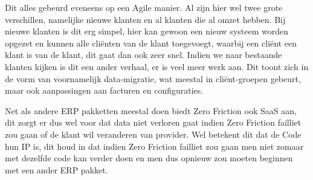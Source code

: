 Dit alles gebeurd eveneens op een Agile manier. Al zijn hier wel twee grote verschillen, namelijke nieuwe klanten en al klanten die al omzet hebben. Bij nieuwe klanten is dit erg simpel, hier kan gewoon een nieuw systeem worden opgezet en kunnen alle cliënten van de klant toegevoegt, waarbij een cliënt een klant is van de klant, dit gaat dan ook zeer snel. Indien we naar bestaande klanten kijken is dit een ander verhaal, er is veel meer werk aan. Dit toont zich in de vorm van voornamelijk data-migratie, wat meestal in cliënt-groepen gebeurt, maar ook aanpassingen aan facturen en configuraties.

Net als andere ERP pakketten meestal doen biedt Zero Friction ook SaaS aan, dit zorgt er dus wel voor dat data niet verloren gaat indien Zero Friction failliet zou gaan of de klant wil veranderen van provider. Wel betekent dit dat de Code hun IP is, dit houd in dat indien Zero Friction failliet zou gaan men niet zomaar met dezelfde code kan verder doen en men dus opnieuw zou moeten beginnen met een ander ERP pakket.
